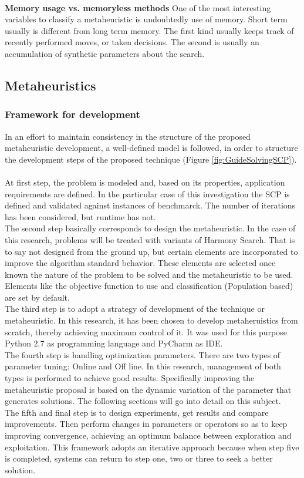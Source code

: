 ~\\
\textbf{Memory usage vs. memoryless methods}
One of the most interesting variables to classify a metaheuristic is undoubtedly use of memory. Short term usually is different from long term memory. The first kind usually keeps track of recently performed moves, or taken decisions. The second is usually an accumulation of synthetic parameters about the search. 

\subsection{Metaheuristics}

\subsubsection{Framework for development}
In an effort to maintain consistency in the structure of the proposed metaheuristic development, a well-defined model is followed, in order to structure the development steps of the proposed technique (Figure \ref{fig:GuideSolvingSCP}). \\
~\\
At first step, the problem is modeled and, based on its properties, application requirements are defined. In the particular case of this investigation the SCP is defined and validated against instances of benchmarck. The number of iterations has been considered, but runtime has not.\\

The second step basically corresponds to design the metaheuristic. In the case of this research, problems will be treated with variants of Harmony Search. That is to say not designed from the ground up, but certain elements are incorporated to improve the algorithm standard behavior. These elements are selected once known the nature of the problem to be solved and the metaheuristic to be used. Elements like the objective function to use and classification (Population based) are set by default.\\

The third step is to adopt a strategy of development of the technique or metaheuristic. In this research, it has been chosen to develop metaheruistics from scratch, thereby achieving maximum control of it. It was used for this purpose Python 2.7 as programming language and  PyCharm as IDE.\\

The fourth step is handling optimization parameters. There are two types of parameter tuning: Online and Off line. In this research, management of both types is performed to achieve good results. Specifically improving the metaheuristic proposal is based on the dynamic variation of the parameter that generates solutions. The following sections will go into detail on this subject.\\

The fifth and final step is to design experiments, get results and compare improvements. Then perform changes in parameters or operators so as to keep improving convergence, achieving an optimum balance between exploration and exploitation. This framework adopts an iterative approach because when step five is completed, systems can return to step one, two or three to seek a better solution.